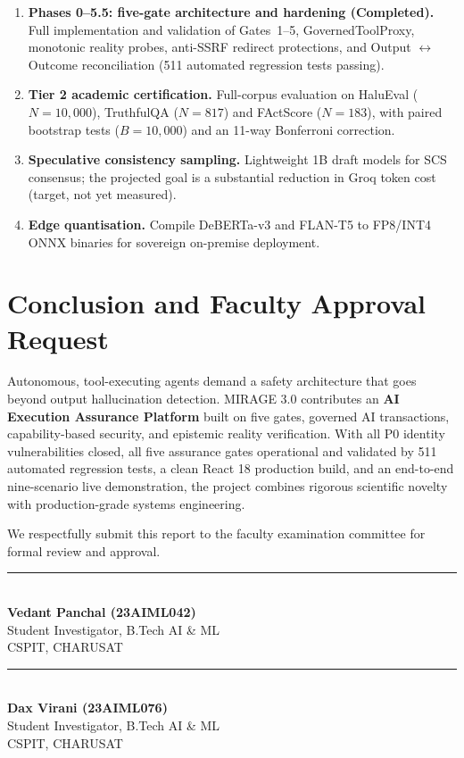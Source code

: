\documentclass[11pt,a4paper]{article}
\begin{document}
\begin{enumerate}[leftmargin=*,itemsep=2pt]
  \item \textbf{Phases 0--5.5: five-gate architecture and hardening (Completed).} Full implementation and validation of Gates~1--5, GovernedToolProxy, monotonic reality probes, anti-SSRF redirect protections, and Output $\leftrightarrow$ Outcome reconciliation (511 automated regression tests passing).
  \item \textbf{Tier 2 academic certification.} Full-corpus evaluation on HaluEval \cite{li2023halueval} ($N=10{,}000$), TruthfulQA \cite{lin2022truthfulqa} ($N=817$) and FActScore \cite{min2023} ($N=183$), with paired bootstrap tests ($B=10{,}000$) and an 11-way Bonferroni correction.
  \item \textbf{Speculative consistency sampling.} Lightweight 1B draft models for SCS consensus; the projected goal is a substantial reduction in Groq token cost (target, not yet measured).
  \item \textbf{Edge quantisation.} Compile DeBERTa-v3 and FLAN-T5 to FP8/INT4 ONNX binaries for sovereign on-premise deployment.
\end{enumerate}

\section{Conclusion and Faculty Approval Request}
Autonomous, tool-executing agents demand a safety architecture that goes beyond output hallucination detection. MIRAGE 3.0 contributes an \textbf{AI Execution Assurance Platform} built on five gates, governed AI transactions, capability-based security, and epistemic reality verification. With all P0 identity vulnerabilities closed, all five assurance gates operational and validated by 511 automated regression tests, a clean React 18 production build, and an end-to-end nine-scenario live demonstration, the project combines rigorous scientific novelty with production-grade systems engineering.

\medskip
We respectfully submit this report to the faculty examination committee for formal review and approval.

\vspace{1.0cm}
\noindent
\begin{minipage}[t]{0.46\textwidth}
  \rule{\linewidth}{0.6pt}\\
  \textbf{Vedant Panchal (23AIML042)}\\
  Student Investigator, B.Tech AI \& ML\\
  CSPIT, CHARUSAT
\end{minipage}
\hfill
\begin{minipage}[t]{0.46\textwidth}
  \rule{\linewidth}{0.6pt}\\
  \textbf{Dax Virani (23AIML076)}\\
  Student Investigator, B.Tech AI \& ML\\
  CSPIT, CHARUSAT
\end{minipage}
\end{document}
